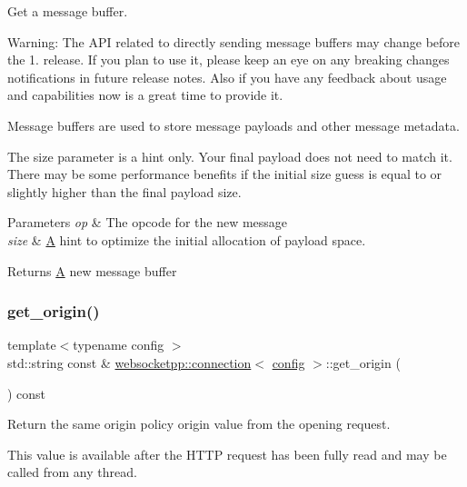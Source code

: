 Get a message buffer. 

Warning\+: The A\+PI related to directly sending message buffers may change before the 1. release. If you plan to use it, please keep an eye on any breaking changes notifications in future release notes. Also if you have any feedback about usage and capabilities now is a great time to provide it.

Message buffers are used to store message payloads and other message metadata.

The size parameter is a hint only. Your final payload does not need to match it. There may be some performance benefits if the initial size guess is equal to or slightly higher than the final payload size.


\begin{DoxyParams}{Parameters}
{\em op} & The opcode for the new message \\
\hline
{\em size} & \mbox{\hyperlink{struct_a}{A}} hint to optimize the initial allocation of payload space. \\
\hline
\end{DoxyParams}
\begin{DoxyReturn}{Returns}
\mbox{\hyperlink{struct_a}{A}} new message buffer 
\end{DoxyReturn}
\mbox{\label{classwebsocketpp_1_1connection_a428a8ee0bd94a7dadf6a4831c756ead3}} 
\subsubsection{\texorpdfstring{get\+\_\+origin()}{get\_origin()}}
{\footnotesize\ttfamily template$<$typename config $>$ \\
std\+::string const  \& \mbox{\hyperlink{classwebsocketpp_1_1connection}{websocketpp\+::connection}}$<$ \mbox{\hyperlink{classconfig}{config}} $>$\+::get\+\_\+origin (\begin{DoxyParamCaption}{ }\end{DoxyParamCaption}) const}



Return the same origin policy origin value from the opening request. 

This value is available after the H\+T\+TP request has been fully read and may be called from any thread.

